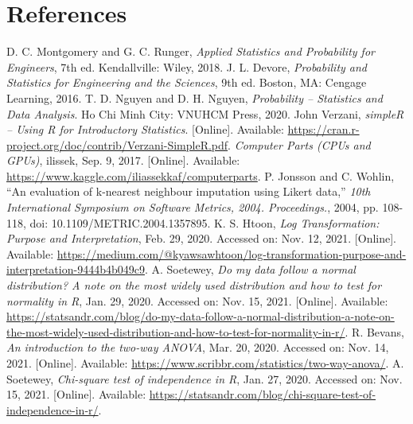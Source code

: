 \documentclass[a4paper]{article}
\begin{document}
\section{References}
\begin{thebibliography}{9}
     D. C. Montgomery and G. C. Runger, \emph{Applied Statistics and Probability for Engineers}, 7th ed. Kendallville: Wiley, 2018.
     J. L. Devore, \emph{Probability and Statistics for Engineering and the Sciences}, 9th ed. Boston, MA: Cengage Learning, 2016.
     T. D. Nguyen and D. H. Nguyen, \emph{Probability – Statistics and Data Analysis}. Ho Chi Minh City: VNUHCM Press, 2020.
     John Verzani, \emph{simpleR – Using R for Introductory Statistics}. [Online]. Available: \href{https://cran.r-project.org/doc/contrib/Verzani-SimpleR.pdf}{https://cran.r-project.org/doc/contrib/Verzani-SimpleR.pdf}.
     \emph{Computer Parts (CPUs and GPUs)}, ilissek, Sep. 9, 2017. [Online]. Available: \href{https://www.kaggle.com/iliassekkaf/computerparts}{https://www.kaggle.com/iliassekkaf/computerparts}.
     P. Jonsson and C. Wohlin, “An evaluation of k-nearest neighbour imputation using Likert data,” \emph{10th International Symposium on Software Metrics, 2004. Proceedings.}, 2004, pp. 108-118, doi: 10.1109/METRIC.2004.1357895.
     K. S. Htoon, \emph{Log Transformation: Purpose and Interpretation}, Feb. 29, 2020. Accessed on: Nov. 12, 2021. [Online]. Available: \href{https://medium.com/@kyawsawhtoon/log-transformation-purpose-and-interpretation-9444b4b049c9}{https://medium.com/@kyawsawhtoon/log-transformation-purpose-and-interpretation-9444b4b049c9}.
     A. Soetewey, \emph{Do my data follow a normal distribution? A note on the most widely used distribution and how to test for normality in R}, Jan. 29, 2020. Accessed on: Nov. 15, 2021. [Online]. Available: \href{https://statsandr.com/blog/do-my-data-follow-a-normal-distribution-a-note-on-the-most-widely-used-distribution-and-how-to-test-for-normality-in-r/}{https://statsandr.com/blog/do-my-data-follow-a-normal-distribution-a-note-on-the-most-widely-used-distribution-and-how-to-test-for-normality-in-r/}.
     R. Bevans, \emph{An introduction to the two-way ANOVA}, Mar. 20, 2020. Accessed on: Nov. 14, 2021. [Online]. Available: \href{https://www.scribbr.com/statistics/two-way-anova/}{https://www.scribbr.com/statistics/two-way-anova/}.
     A. Soetewey, \emph{Chi-square test of independence in R}, Jan. 27, 2020. Accessed on: Nov. 15, 2021. [Online]. Available: \href{https://statsandr.com/blog/chi-square-test-of-independence-in-r/}{https://statsandr.com/blog/chi-square-test-of-independence-in-r/}. %

\end{thebibliography}
\end{document}
